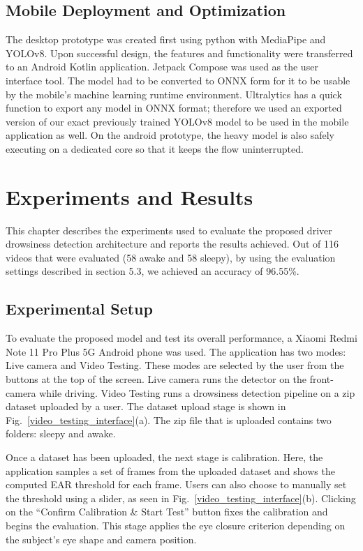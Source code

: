\documentclass[pdflatex,sn-mathphys-num]{sn-jnl}
\theoremstyle{thmstyleone}%
\theoremstyle{thmstyletwo}%
\theoremstyle{thmstylethree}%
\begin{document}
	
	\subsection{Mobile Deployment and Optimization}\label{sec:deploy}
	The desktop prototype was created first using python with MediaPipe and YOLOv8. Upon successful design, the features and functionality were transferred to an Android Kotlin application. Jetpack Compose was used as the user interface tool. The model had to be converted to ONNX form for it to be usable by the mobile’s machine learning runtime environment. Ultralytics has a quick function to export any model in ONNX format; therefore we used an exported version of our exact previously trained YOLOv8 model to be used in the mobile application as well. On the android prototype, the heavy model is also safely executing on a dedicated core so that it keeps the flow uninterrupted.
	
	\section{Experiments and Results}\label{sec:exp}
	This chapter describes the experiments used to evaluate the proposed driver drowsiness detection architecture and reports the results achieved. Out of 116 videos that were evaluated (58 awake and 58 sleepy), by using the evaluation settings described in section 5.3, we achieved an accuracy of 96.55\%.
	
	\subsection{Experimental Setup}\label{sec:setup}
	To evaluate the proposed model and test its overall performance, a Xiaomi Redmi Note 11 Pro Plus 5G Android phone was used. The application has two modes: Live camera and Video Testing. These modes are selected by the user from the buttons at the top of the screen. Live camera runs the detector on the front-camera while driving. Video Testing runs a drowsiness detection pipeline on a zip dataset uploaded by a user. The dataset upload stage is shown in Fig.~\ref{video_testing_interface}(a). The zip file that is uploaded contains two folders: sleepy and awake.

	Once a dataset has been uploaded, the next stage is calibration. Here, the application samples a set of frames from the uploaded dataset and shows the computed EAR threshold for each frame. Users can also choose to manually set the threshold using a slider, as seen in Fig.~\ref{video_testing_interface}(b). Clicking on the ``Confirm Calibration \& Start Test'' button fixes the calibration and begins the evaluation. This stage applies the eye closure criterion depending on the subject's eye shape and camera position.
	
\end{document}
